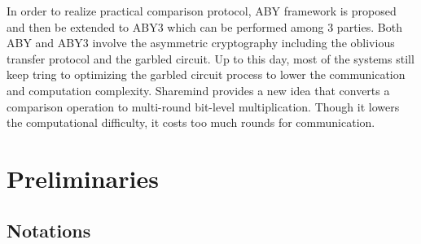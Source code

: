 \documentclass[letterpaper]{article} %
\begin{document}
    In order to realize practical comparison protocol, ABY framework \cite{ABY} is proposed
    and then be extended to ABY3 \cite{ABY3} which can be performed among 3 parties.
    Both ABY and ABY3 involve the asymmetric cryptography
    including the oblivious transfer protocol and the garbled circuit.
    Up to this day, most of the systems \cite{2022GarbledCircuit} still keep tring to optimizing
    the garbled circuit process to lower the communication and computation complexity.
    Sharemind \cite{Sharemind} provides a new idea that converts a comparison operation to
    multi-round bit-level multiplication.
    Though it lowers the computational difficulty, it costs too much rounds for
    communication.

\section{Preliminaries}
    \subsection{Notations}
\end{document}
